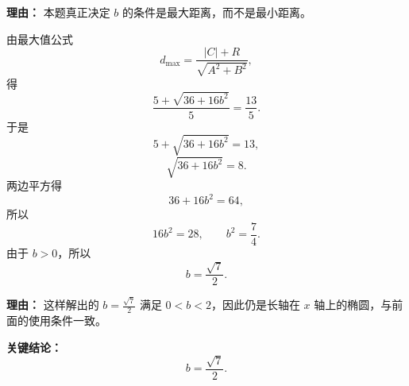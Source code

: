 \begin{examplebox}
\begin{description}[style=nextline, leftmargin=2.8em, labelsep=0.5em, itemsep=0.45em]
		      \par\textbf{理由：}
		      本题真正决定 \(b\) 的条件是最大距离，而不是最小距离。

		\item[\textbf{第三步（利用 \(d_{\max}=\frac{13}{5}\) 列方程）：}]
		      由最大值公式
		      \[
			      d_{\max}
			      =
			      \frac{|C|+R}{\sqrt{A^2+B^2}},
		      \]
		      得
		      \[
			      \frac{5+\sqrt{36+16b^2}}{5}
			      =
			      \frac{13}{5}.
		      \]
		      于是
		      \[
			      5+\sqrt{36+16b^2}=13,
		      \]
		      \[
			      \sqrt{36+16b^2}=8.
		      \]
		      两边平方得
		      \[
			      36+16b^2=64,
		      \]
		      所以
		      \[
			      16b^2=28,
			      \qquad
			      b^2=\frac{7}{4}.
		      \]
		      由于 \(b>0\)，所以
		      \[
			      b=\frac{\sqrt7}{2}.
		      \]

		      \par\textbf{理由：}
		      这样解出的 \(b=\frac{\sqrt7}{2}\) 满足 \(0<b<2\)，因此仍是长轴在 \(x\) 轴上的椭圆，与前面的使用条件一致。
	\end{description}

	\textbf{\textcolor{CExample}{关键结论：}}
	\[
		b=\frac{\sqrt7}{2}.
	\]

\end{examplebox}